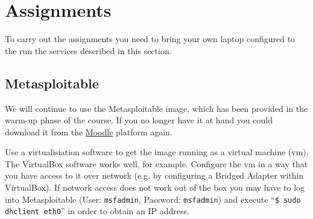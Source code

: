 \documentclass{report}
\makeatletter
\renewcommand{\paragraph}{
  \@startsection{paragraph}{4}
    {\z@}{1.25ex \@plus 1ex \@minus .2ex}{-1em}
      {\normalfont\normalsize\bfseries}
      }
\makeatother
\begin{document}

\newpage
\section{Assignments}

To carry out the assignments you need to bring your own laptop configured
to the run the services described in this section.

\subsection{Metasploitable}
We will continue to use the Metasploitable image, which has been provided 
in the warm-up phase of the course. If you no longer have it at hand you
could download it from the 
\href{https://moodle.uni-ulm.de/course/view.php?id=1312}{Moodle} platform
again. 

Use a virtualisiation software to get the image running as a virtual 
machine (vm). The VirtualBox software works well, for example. Configure 
the vm in a way that you have access to it over network (e.g. by configuring 
a Bridged Adapter within VirtualBox). If network access does not work out 
of the box you may have to log into Metasploitable (User: \texttt{msfadmin}, 
Password: \texttt{msfadmin}) and execute ``\texttt{\$ sudo dhclient eth0}'' 
in order to obtain an IP address.
\end{document}

